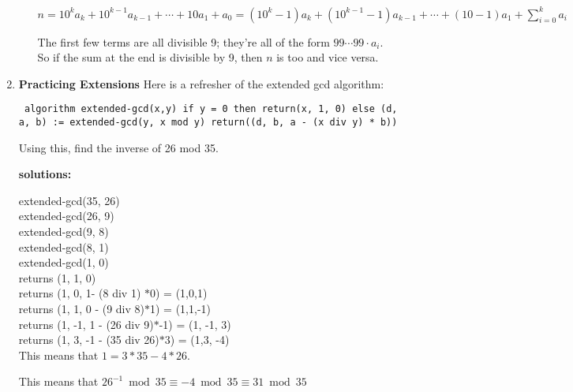\documentclass[11pt]{article}
\newif\ifsolutions
\begin{document}
\begin{enumerate}
\begin{enumerate}
       $n = 10^k a_k + 10^{k-1}a_{k-1} + \cdots + 10a_1 + a_0 = (10^k-1) a_k + (10^{k-1}-1)a_{k-1} + \cdots + (10-1)a_1 + \sum_{i=0}^k a_i$

       The first few terms are all divisible 9; they're all of the form $99\cdots 99 \cdot a_i$.
       So if the sum at the end is divisible by 9, then $n$ is too and vice versa. 
\end{enumerate}
\fi

\vspace{35mm}

\item {\bf Practicing Extensions} Here is a refresher of the extended gcd algorithm:

{\obeylines \tt
algorithm extended-gcd(x,y)
\quad if y = 0 then return(x, 1, 0)
\quad else
\quad\quad (d, a, b) := extended-gcd(y, x mod y)
\quad\quad return((d, b, a - (x div y) * b))}

Using this, find the inverse of 26 mod 35.

\ifsolutions
\newpage
 {\bf solutions:} 

extended-gcd(35, 26) \\
\tab extended-gcd(26, 9) \\
\tab \tab extended-gcd(9, 8) \\
\tab \tab \tab extended-gcd(8, 1) \\
\tab \tab \tab \tab extended-gcd(1, 0) \\
\tab \tab\tab \tab returns (1, 1, 0) \\
\tab \tab \tab returns (1, 0, 1- (8 div 1) $*$0) = (1,0,1)  \\
\tab \tab returns (1, 1, 0 - (9 div 8)$*$1) = (1,1,-1) \\
\tab returns (1, -1, 1 - (26 div 9)$*$-1) = (1, -1, 3) \\
returns (1, 3, -1 - (35 div 26)$*$3) = (1,3, -4) \\

This means that $1 = 3*35 -4*26$.

This means that $26^{-1} \bmod{35} \equiv -4 \bmod{35} \equiv 31 \bmod{35}$



\end{enumerate}
\end{document}
